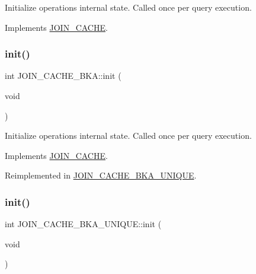 Initialize operation\textquotesingle{}s internal state. Called once per query execution. 

Implements \mbox{\hyperlink{classJOIN__CACHE_a1dcdce348bba725c675b327eb90aa924}{J\+O\+I\+N\+\_\+\+C\+A\+C\+HE}}.

\mbox{\label{group__Query__Optimizer_ga327376f63198bf31a770fb89242d49aa}} 
\subsubsection{\texorpdfstring{init()}{init()}\hspace{0.1cm}{\footnotesize\ttfamily [2/3]}}
{\footnotesize\ttfamily int J\+O\+I\+N\+\_\+\+C\+A\+C\+H\+E\+\_\+\+B\+K\+A\+::init (\begin{DoxyParamCaption}\item[{void}]{ }\end{DoxyParamCaption})\hspace{0.3cm}{\ttfamily [virtual]}}

Initialize operation\textquotesingle{}s internal state. Called once per query execution. 

Implements \mbox{\hyperlink{classJOIN__CACHE_a1dcdce348bba725c675b327eb90aa924}{J\+O\+I\+N\+\_\+\+C\+A\+C\+HE}}.



Reimplemented in \mbox{\hyperlink{group__Query__Optimizer_gaa7ca6a85294c32bac8c69bea0c4e5fe1}{J\+O\+I\+N\+\_\+\+C\+A\+C\+H\+E\+\_\+\+B\+K\+A\+\_\+\+U\+N\+I\+Q\+UE}}.

\mbox{\label{group__Query__Optimizer_gaa7ca6a85294c32bac8c69bea0c4e5fe1}} 
\subsubsection{\texorpdfstring{init()}{init()}\hspace{0.1cm}{\footnotesize\ttfamily [3/3]}}
{\footnotesize\ttfamily int J\+O\+I\+N\+\_\+\+C\+A\+C\+H\+E\+\_\+\+B\+K\+A\+\_\+\+U\+N\+I\+Q\+U\+E\+::init (\begin{DoxyParamCaption}\item[{void}]{ }\end{DoxyParamCaption})\hspace{0.3cm}{\ttfamily [virtual]}}

